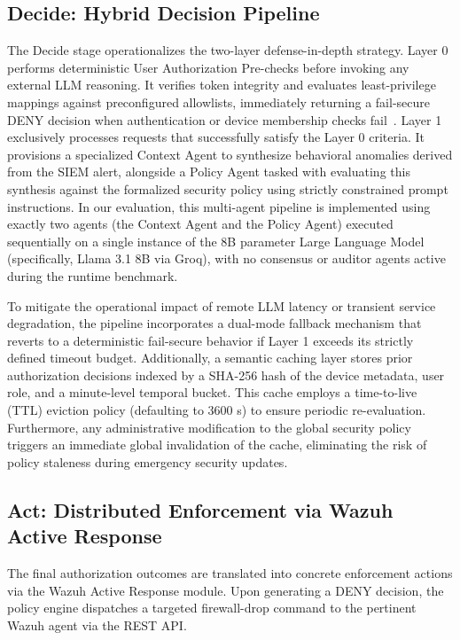 \documentclass[
]{ceurart}
\begin{document}
\subsection{Decide: Hybrid Decision Pipeline}\label{sec:decision_pipeline}

The Decide stage operationalizes the two-layer defense-in-depth strategy. Layer 0 performs deterministic User Authorization Pre-checks before invoking any external LLM reasoning. It verifies token integrity and evaluates least-privilege mappings against preconfigured allowlists, immediately returning a fail-secure DENY decision when authentication or device membership checks fail~\cite{mitre2023attack}. Layer 1 exclusively processes requests that successfully satisfy the Layer 0 criteria. It provisions a specialized Context Agent to synthesize behavioral anomalies derived from the SIEM alert, alongside a Policy Agent tasked with evaluating this synthesis against the formalized security policy using strictly constrained prompt instructions. In our evaluation, this multi-agent pipeline is implemented using exactly two agents (the Context Agent and the Policy Agent) executed sequentially on a single instance of the 8B parameter Large Language Model (specifically, Llama 3.1 8B via Groq), with no consensus or auditor agents active during the runtime benchmark.

To mitigate the operational impact of remote LLM latency or transient service degradation, the pipeline incorporates a dual-mode fallback mechanism that reverts to a deterministic fail-secure behavior if Layer 1 exceeds its strictly defined timeout budget. Additionally, a semantic caching layer stores prior authorization decisions indexed by a SHA-256 hash of the device metadata, user role, and a minute-level temporal bucket. This cache employs a time-to-live (TTL) eviction policy (defaulting to 3600 s) to ensure periodic re-evaluation. Furthermore, any administrative modification to the global security policy triggers an immediate global invalidation of the cache, eliminating the risk of policy staleness during emergency security updates.

\subsection{Act: Distributed Enforcement via Wazuh Active Response}

The final authorization outcomes are translated into concrete enforcement actions via the Wazuh Active Response module. Upon generating a DENY decision, the policy engine dispatches a targeted firewall-drop command to the pertinent Wazuh agent via the REST API.
\end{document}
